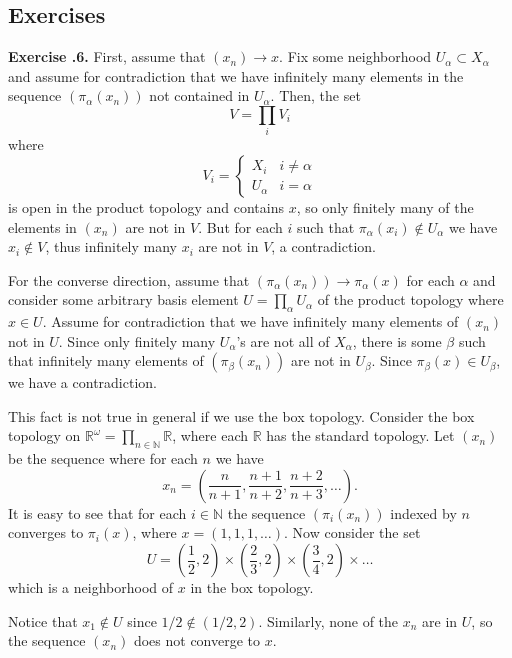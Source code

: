 \documentclass{report}
\theoremstyle{definition}
\theoremstyle{remark}
\newenvironment{exc}[1]{\noindent\textbf{Exercise \thesection.#1.}}{\medskip}
\newcommand{\N}{\mathbb{N}}
\newcommand{\R}{\mathbb{R}}
\newcommand{\paren}[1]{\left( #1 \right)}
\begin{document}
\subsection*{Exercises}
\begin{exc}{6}
    First, assume that $(x_n) \to x$. Fix some neighborhood $U_\alpha \subset X_\alpha$ and assume for contradiction that we have infinitely many elements in the sequence $(\pi_\alpha(x_n))$ not contained in $U_\alpha$. Then, the set
    \begin{equation*}
        V = \prod_i V_i
    \end{equation*} where 
    \begin{equation*}
        V_i = 
        \begin{cases}
        X_i & i \neq \alpha \\
        U_\alpha & i = \alpha
        \end{cases}
    \end{equation*} is open in the product topology and contains $x$, so only finitely many of the elements in $(x_n)$ are not in $V$. But for each $i$ such that $\pi_\alpha(x_i) \notin U_\alpha$ we have $x_i \notin V$, thus infinitely many $x_i$ are not in $V$, a contradiction.
    
    For the converse direction, assume that $(\pi_\alpha(x_n)) \to \pi_\alpha(x)$ for each $\alpha$ and consider some arbitrary basis element $U = \prod_\alpha U_\alpha$ of the product topology where $x \in U$. Assume for contradiction that we have infinitely many elements of $(x_n)$ not in $U$. Since only finitely many $U_\alpha$'s are not all of $X_\alpha$, there is some $\beta$ such that infinitely many elements of $(\pi_\beta(x_n))$ are not in $U_\beta$. Since $\pi_\beta(x) \in U_\beta$, we have a contradiction.
    
    This fact is not true in general if we use the box topology. Consider the box topology on $\R^\omega = \prod_{n \in \N} \R$, where each $\R$ has the standard topology. Let $(x_n)$ be the sequence where for each $n$ we have
    \begin{equation*}
        x_n = \paren{\frac{n}{n+1},\frac{n+1}{n+2}, \frac{n+2}{n+3}, \dots}.
    \end{equation*} It is easy to see that for each $i \in \N$ the sequence $(\pi_i(x_n))$ indexed by $n$ converges to $\pi_i(x)$, where $x = (1,1,1, \dots)$. Now consider the set 
    \begin{equation*}
        U = \paren{\frac{1}{2}, 2} \times \paren{\frac{2}{3}, 2} \times \paren{\frac{3}{4}, 2} \times \dots
    \end{equation*} which is a neighborhood of $x$ in the box topology.
    
    Notice that $x_1 \notin U$ since $1/2 \notin (1/2, 2)$. Similarly, none of the $x_n$ are in $U$, so the sequence $(x_n)$ does not converge to $x$.
\end{exc}
\end{document}
